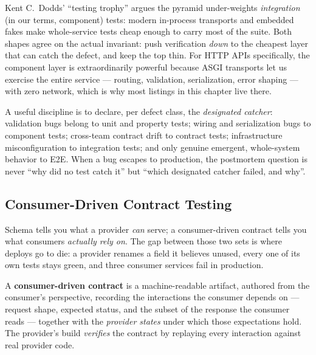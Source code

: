 \begin{remark}
Kent C.~Dodds' ``testing trophy'' argues the pyramid under-weights
\emph{integration} (in our terms, component) tests: modern in-process
transports and embedded fakes make whole-service tests cheap enough to
carry most of the suite. Both shapes agree on the actual invariant: push
verification \emph{down} to the cheapest layer that can catch the defect,
and keep the top thin. For HTTP APIs specifically, the component layer is
extraordinarily powerful because ASGI transports let us exercise the entire
service --- routing, validation, serialization, error shaping --- with zero
network, which is why most listings in this chapter live there.
\end{remark}

A useful discipline is to declare, per defect class, the \emph{designated
catcher}: validation bugs belong to unit and property tests; wiring and
serialization bugs to component tests; cross-team contract drift to
contract tests; infrastructure misconfiguration to integration tests; and
only genuine emergent, whole-system behavior to E2E. When a bug escapes to
production, the postmortem question is never ``why did no test catch it''
but ``which designated catcher failed, and why''.

\subsection{Consumer-Driven Contract Testing}
\label{sec:ch19-contracts}

Schema tells you what a provider \emph{can} serve; a consumer-driven
contract tells you what consumers \emph{actually rely on}. The gap between
those two sets is where deploys go to die: a provider renames a field it
believes unused, every one of its own tests stays green, and three consumer
services fail in production.

\begin{definition}
\label{def:cdc}
A \textbf{consumer-driven contract} is a machine-readable artifact,
authored from the consumer's perspective, recording the interactions the
consumer depends on --- request shape, expected status, and the subset of
the response the consumer reads --- together with the \emph{provider
states} under which those expectations hold. The provider's build
\emph{verifies} the contract by replaying every interaction against real
provider code.
\end{definition}

